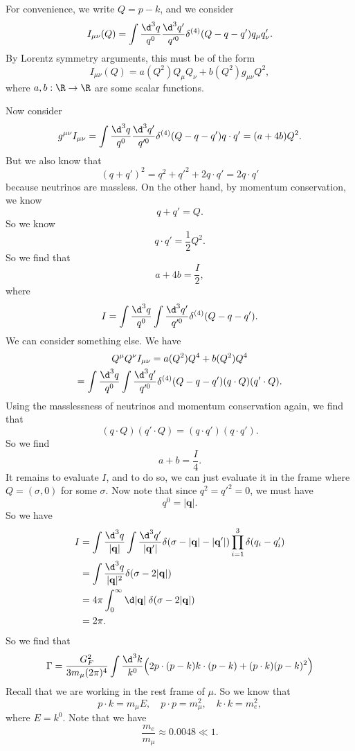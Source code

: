 \documentclass[a4paper]{article}
\begin{document}
For convenience, we write $Q = p - k$, and we consider
\[
  I_{\mu\nu}(Q) = \int \frac{\d^3 q}{q^0} \frac{\d^3 q'}{q'^0} \delta^{(4)}(Q - q - q') q_\mu q'_\nu.
\]
By Lorentz symmetry arguments, this must be of the form
\[
  I_{\mu\nu} (Q) = a(Q^2) Q_\mu Q_\nu + b(Q^2) g_{\mu\nu} Q^2,
\]
where $a, b: \R \to \R$ are some scalar functions.

Now consider
\[
  g^{\mu\nu} I_{\mu\nu} = \int \frac{\d^3 q}{q^0} \frac{\d^3 q'}{q'^0} \delta^{(4)}(Q - q - q') q \cdot q' = (a + 4b) Q^2 .
\]
But we also know that
\[
  (q + q')^2 = q^2 + q'^2 + 2 q \cdot q' = 2 q \cdot q'
\]
because neutrinos are massless. On the other hand, by momentum conservation, we know
\[
  q + q' = Q.
\]
So we know
\[
  q \cdot q' = \frac{1}{2} Q^2.
\]
So we find that
\[
  a + 4b = \frac{I}{2},\tag{$1$}
\]
where
\[
  I = \int \frac{\d^3 q}{q^0} \int \frac{\d^3 q'}{q'^0} \delta^{(4)} (Q - q - q').
\]
We can consider something else. We have
\begin{multline*}
  Q^\mu Q^\nu I_{\mu\nu} = a(Q^2) Q^4 + b(Q^2) Q^4 \\
  = \int \frac{\d^3 q}{q^0} \int \frac{\d^3 q'}{q'^0} \delta^{(4)} (Q - q - q') (q\cdot Q) (q' \cdot Q).
\end{multline*}
Using the masslessness of neutrinos and momentum conservation again, we find that
\[
  (q \cdot Q) (q' \cdot Q) = (q \cdot q') (q \cdot q').
\]
So we find
\[
  a + b = \frac{I}{4}\tag{$2$}.
\]
It remains to evaluate $I$, and to do so, we can just evaluate it in the frame where $Q = (\sigma, 0)$ for some $\sigma$. Now note that since $q^2 = q'^2 = 0$, we must have
\[
  q^0 = |\mathbf{q}|.
\]
So we have
\begin{align*}
  I &= \int \frac{\d^3 q}{|\mathbf{q}|} \int \frac{\d^3 q'}{|\mathbf{q}'|} \delta(\sigma - |\mathbf{q}| - |\mathbf{q}'|) \prod_{i = 1}^3 \delta(q_i - q_i')\\
  &= \int \frac{\d^3 q}{|\mathbf{q}|^2} \delta(\sigma - 2|\mathbf{q}|)\\
  &= 4\pi \int_0^\infty \d |\mathbf{q}|\; \delta(\sigma - 2|\mathbf{q}|)\\
  &= 2\pi.
\end{align*}
So we find that
\[
  \Gamma = \frac{G_F^2}{3 m_\mu (2\pi)^4} \int \frac{\d^3 k}{k^0} \Big(2 p \cdot (p - k) k \cdot (p - k) + (p \cdot k)(p - k)^2\Big)
\]
Recall that we are working in the rest frame of $\mu$. So we know that
\[
  p \cdot k = m_\mu E,\quad p \cdot p = m_\mu^2,\quad k \cdot k = m_e^2,
\]
where $E = k^0$. Note that we have
\[
  \frac{m_e}{m_\mu}\approx 0.0048 \ll 1.
\]
\end{document}
